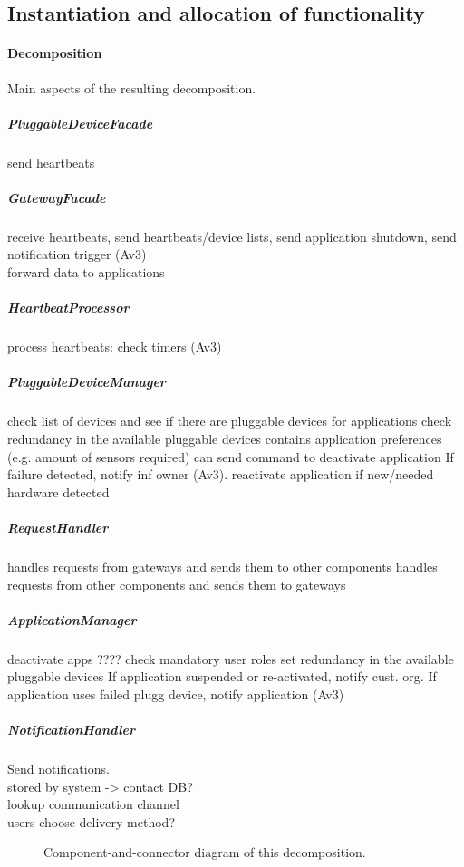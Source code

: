 \subsection{Instantiation and allocation of functionality}
    \paragraph{Decomposition}
    Main aspects of the resulting decomposition.

    \subparagraph{PluggableDeviceFacade}
    send heartbeats

    \subparagraph{GatewayFacade}
    receive heartbeats, send heartbeats/device lists, send application shutdown, send notification trigger (Av3)\\
    forward data to applications

    \subparagraph{HeartbeatProcessor}
    process heartbeats: check timers (Av3)

    \subparagraph{PluggableDeviceManager}
    check list of devices and see if there are pluggable devices for applications
    check redundancy in the available pluggable devices
    contains application preferences (e.g. amount of sensors required)
    can send command to deactivate application
    If failure detected, notify inf owner (Av3).
    reactivate application if new/needed hardware detected

    \subparagraph{RequestHandler}
    handles requests from gateways and sends them to other components
    handles requests from other components and sends them to gateways

    \subparagraph{ApplicationManager}
    deactivate apps
    ???? check mandatory user roles
    set redundancy in the available pluggable devices
    If application suspended or re-activated, notify cust. org.
    If application uses failed plugg device, notify application
    (Av3)

    \subparagraph{NotificationHandler}
    Send notifications. \\
    stored by system -> contact DB? \\
    lookup communication channel \\
    users choose delivery method?

    \begin{figure}[!htp]
    	\centering
    	\caption{Component-and-connector diagram of this decomposition.}
        \label{fig:it1-cc_main}
    \end{figure}

